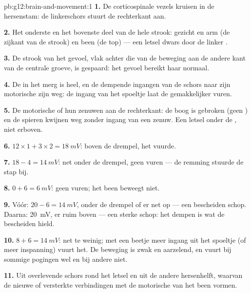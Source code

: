 \begin{solution}{pb:g12:brain-and-movement:1}
\textbf{1.} De corticospinale vezels kruisen in de hersenstam: de
linkerschors stuurt de rechterkant aan.

\textbf{2.} Het onderste en het bovenste deel van de hele strook: gezicht
en arm (de zijkant van de strook) en been (de top) --- een letsel dwars
door de linker .

\textbf{3.} De strook van het gevoel, vlak achter die van de beweging aan
de andere kant van de centrale groeve, is gespaard: het gevoel bereikt
haar normaal.

\textbf{4.} De  in het merg is heel, en de dempende ingangen van
de schors naar zijn motorische  zijn weg: de ingang van het
spoeltje laat de  gemakkelijker vuren.

\textbf{5.} De motorische  of hun zenuwen aan de rechterkant: de
boog is gebroken (geen ) en de spieren kwijnen weg zonder ingang van
een zenuw. Een letsel onder de , niet erboven.

\textbf{6.} $12 \times 1 + 3 \times 2 = \qty{18}{mV}$: boven de drempel,
het vuurde.

\textbf{7.} $18 - 4 = \qty{14}{mV}$: net onder de drempel, geen vuren ---
de remming stuurde de stap bij.

\textbf{8.} $0 + 6 = \qty{6}{mV}$: geen vuren; het been beweegt niet.

\textbf{9.} Vóór: $20 - 6 = \qty{14}{mV}$, onder de drempel of er net op
--- een bescheiden schop. Daarna: \qty{20}{mV}, er ruim boven --- een
sterke schop: het dempen is wat de  bescheiden hield.

\textbf{10.} $8 + 6 = \qty{14}{mV}$: net te weinig; met een beetje meer
ingang uit het spoeltje (of meer inspanning) vuurt het. De beweging is
zwak en aarzelend, en vuurt bij sommige pogingen wel en bij andere niet.

\textbf{11.} Uit overlevende schors rond het letsel en uit de andere
hersenhelft, waarvan de  nieuwe of versterkte verbindingen met de
motorische  van het been vormen.


\end{solution}

